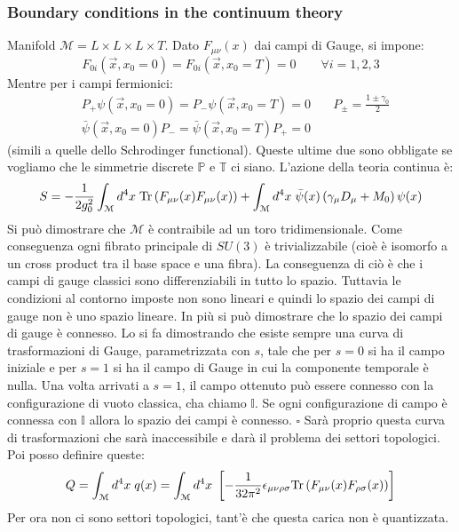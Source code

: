 \documentclass[12pt,a4paper,openright]{article}
\newcommand{\colg}{\textcolor{PineGreen}}
\newcommand{\colr}{\textcolor{BrickRed}}
\newcommand{\tr}{\text{Tr}}
\newcommand{\spc}{\hspace*{1mm}}
\begin{document}
\subsubsection*{Boundary conditions in the continuum theory}
Manifold $\mathcal{M} = L \times L \times L \times T$. Dato $F_{\mu\nu} (x)$ dai campi di Gauge, si impone:\
\begin{equation}\label{eq:obc}
  F_{0i}(\vec{x}, x_0 = 0) = F_{0i}(\vec{x}, x_0 = T) = 0 \quad \quad \forall i = 1,2,3
\end{equation}
Mentre per i campi fermionici:
\begin{equation*}
  \begin{aligned}
    & P_+ \psi (\vec x, x_0 = 0) = P_- \psi (\vec x, x_0 = T) = 0  & \quad P_{\pm} = \frac{1 \pm \gamma_0}{2} \\
    & \bar \psi (\vec x, x_0 = 0) P_- = \bar \psi (\vec x, x_0 = T) P_+ = 0
  \end{aligned}
\end{equation*}
(simili a quelle dello Schrodinger functional). Queste ultime due sono obbligate se vogliamo che le simmetrie discrete $\mathbb{P}$ e $\mathbb{T}$ ci siano.
L'azione della teoria continua è:
\begin{equation*}
  S = -\frac{1}{2g_0^2} \int_\mathcal{M} d^4 x \spc \tr \left(F_{\mu\nu}(x) F_{\mu\nu}(x) \right) + \int_\mathcal{M} d^4 x \spc \bar \psi (x) \left( \gamma_\mu{D_\mu} + M_0\right)\psi (x)
\end{equation*}
Si può dimostrare che $\mathcal{M}$ è contraibile ad un toro tridimensionale. Come conseguenza ogni fibrato principale di $SU(3)$ è trivializzabile (cioè è isomorfo a un cross product tra il base space e una fibra).
La conseguenza di ciò è che i campi di gauge classici sono differenziabili in tutto lo spazio.
Tuttavia le condizioni al contorno imposte non sono lineari e quindi lo spazio dei campi di gauge non è uno spazio lineare.
\newline
In più si può dimostrare che \colg{lo spazio dei campi di gauge è connesso}.
Lo si fa dimostrando che esiste sempre una curva di trasformazioni di Gauge, parametrizzata con $s$, tale che per $s=0$ si ha il campo iniziale e per $s=1$ si ha il campo di Gauge in cui la componente temporale è nulla.
Una volta arrivati a $s=1$, il campo ottenuto può essere connesso con la configurazione di vuoto classica, cha chiamo $\mathbb{I}$.
Se ogni configurazione di campo è connessa con $\mathbb{I}$ allora lo spazio dei campi è connesso. $\square$
\newline
\colr{Sarà proprio questa curva di trasformazioni che sarà inaccessibile e darà il problema dei settori topologici}.
\newline
Poi posso definire queste:
\begin{equation*}
  Q = \int_\mathcal{M} d^4x \spc q(x) =\int_\mathcal{M} d^4x \spc  \left[ - \frac{1}{32 \pi^2} \epsilon_{\mu\nu\rho\sigma} \tr \left(F_{\mu\nu} (x) F_{\rho\sigma} (x) \right) \right]
\end{equation*}
Per ora non ci sono settori topologici, tant'è che \colg{questa carica non è quantizzata}.
\end{document}
